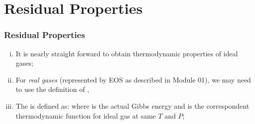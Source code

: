 \documentclass[10pt,compress,unknownkeysallowed]{beamer}
\begin{document}
\section{Residual Properties}
\begin{frame}
  \frametitle{Residual Properties}
     \begin{enumerate}[i)]
        \item<1-> It is nearly straight forward to obtain thermodynamic properties of ideal gases;
        \item<2-> For {\it real gases} (represented by EOS as described in Module 01), we may need to use the definition of , \ie
        \item<3->The  is defined as:
            where  is the actual Gibbs energy and  is the correspondent thermodynamic function for ideal gas at same $T$ and $P$;
     \end{enumerate}

\end{frame}
\normalsize
\end{document}
